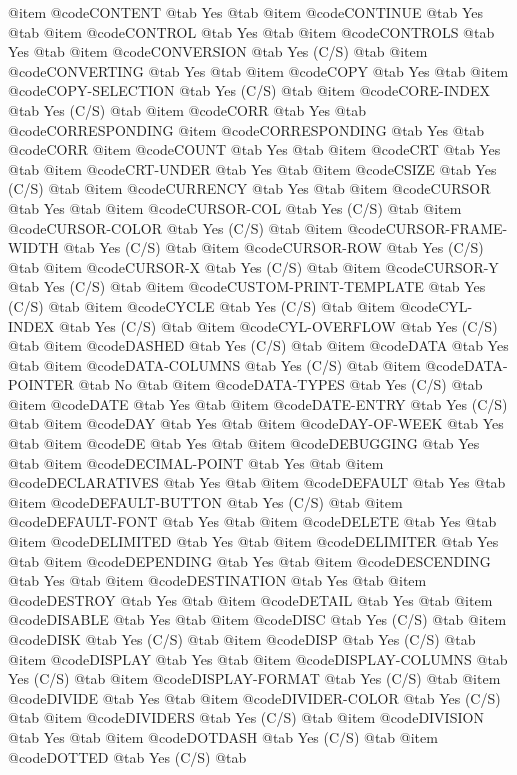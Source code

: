 @item @code{CONTENT} @tab Yes @tab 
@item @code{CONTINUE} @tab Yes @tab 
@item @code{CONTROL} @tab Yes @tab 
@item @code{CONTROLS} @tab Yes @tab 
@item @code{CONVERSION} @tab Yes	(C/S) @tab 
@item @code{CONVERTING} @tab Yes @tab 
@item @code{COPY} @tab Yes @tab 
@item @code{COPY-SELECTION} @tab Yes	(C/S) @tab 
@item @code{CORE-INDEX} @tab Yes	(C/S) @tab 
@item @code{CORR} @tab Yes @tab @code{CORRESPONDING}
@item @code{CORRESPONDING} @tab Yes @tab @code{CORR}
@item @code{COUNT} @tab Yes @tab 
@item @code{CRT} @tab Yes @tab 
@item @code{CRT-UNDER} @tab Yes @tab 
@item @code{CSIZE} @tab Yes	(C/S) @tab 
@item @code{CURRENCY} @tab Yes @tab 
@item @code{CURSOR} @tab Yes @tab 
@item @code{CURSOR-COL} @tab Yes	(C/S) @tab 
@item @code{CURSOR-COLOR} @tab Yes	(C/S) @tab 
@item @code{CURSOR-FRAME-WIDTH} @tab Yes	(C/S) @tab 
@item @code{CURSOR-ROW} @tab Yes	(C/S) @tab 
@item @code{CURSOR-X} @tab Yes	(C/S) @tab 
@item @code{CURSOR-Y} @tab Yes	(C/S) @tab 
@item @code{CUSTOM-PRINT-TEMPLATE} @tab Yes	(C/S) @tab 
@item @code{CYCLE} @tab Yes	(C/S) @tab 
@item @code{CYL-INDEX} @tab Yes	(C/S) @tab 
@item @code{CYL-OVERFLOW} @tab Yes	(C/S) @tab 
@item @code{DASHED} @tab Yes	(C/S) @tab 
@item @code{DATA} @tab Yes @tab 
@item @code{DATA-COLUMNS} @tab Yes	(C/S) @tab 
@item @code{DATA-POINTER} @tab No @tab 
@item @code{DATA-TYPES} @tab Yes	(C/S) @tab 
@item @code{DATE} @tab Yes @tab 
@item @code{DATE-ENTRY} @tab Yes	(C/S) @tab 
@item @code{DAY} @tab Yes @tab 
@item @code{DAY-OF-WEEK} @tab Yes @tab 
@item @code{DE} @tab Yes @tab 
@item @code{DEBUGGING} @tab Yes @tab 
@item @code{DECIMAL-POINT} @tab Yes @tab 
@item @code{DECLARATIVES} @tab Yes @tab 
@item @code{DEFAULT} @tab Yes @tab 
@item @code{DEFAULT-BUTTON} @tab Yes	(C/S) @tab 
@item @code{DEFAULT-FONT} @tab Yes @tab 
@item @code{DELETE} @tab Yes @tab 
@item @code{DELIMITED} @tab Yes @tab 
@item @code{DELIMITER} @tab Yes @tab 
@item @code{DEPENDING} @tab Yes @tab 
@item @code{DESCENDING} @tab Yes @tab 
@item @code{DESTINATION} @tab Yes @tab 
@item @code{DESTROY} @tab Yes @tab 
@item @code{DETAIL} @tab Yes @tab 
@item @code{DISABLE} @tab Yes @tab 
@item @code{DISC} @tab Yes	(C/S) @tab 
@item @code{DISK} @tab Yes	(C/S) @tab 
@item @code{DISP} @tab Yes	(C/S) @tab 
@item @code{DISPLAY} @tab Yes @tab 
@item @code{DISPLAY-COLUMNS} @tab Yes	(C/S) @tab 
@item @code{DISPLAY-FORMAT} @tab Yes	(C/S) @tab 
@item @code{DIVIDE} @tab Yes @tab 
@item @code{DIVIDER-COLOR} @tab Yes	(C/S) @tab 
@item @code{DIVIDERS} @tab Yes	(C/S) @tab 
@item @code{DIVISION} @tab Yes @tab 
@item @code{DOTDASH} @tab Yes	(C/S) @tab 
@item @code{DOTTED} @tab Yes	(C/S) @tab 
